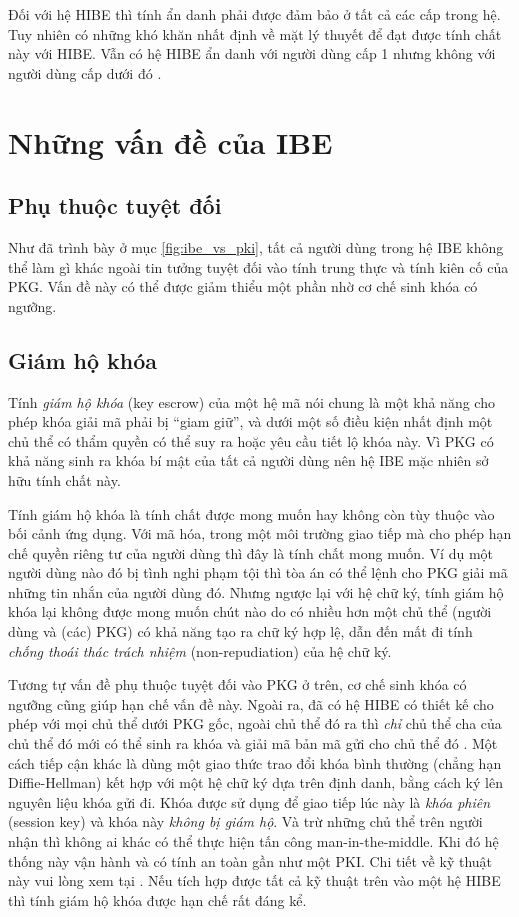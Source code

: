 \documentclass[class=report, crop=false]{standalone}
\begin{document}
			Đối với hệ HIBE thì tính ẩn danh phải được đảm bảo ở tất cả các cấp trong hệ. Tuy nhiên có những khó khăn nhất định về mặt lý thuyết để đạt được tính chất này với HIBE. Vẫn có hệ HIBE ẩn danh với người dùng cấp 1 nhưng không với người dùng cấp dưới đó \cite{DBLP:conf/asiacrypt/GentryS02}.
	\section{Những vấn đề của IBE}
		\subsection{Phụ thuộc tuyệt đối}
			Như đã trình bày ở mục \ref{fig:ibe_vs_pki}, tất cả người dùng trong hệ IBE không thể làm gì khác ngoài tin tưởng tuyệt đối vào tính trung thực và tính kiên cố của PKG. Vấn đề này có thể được giảm thiểu một phần nhờ cơ chế sinh khóa có ngưỡng.
		\subsection{Giám hộ khóa}\label{subsec:key_escrow}
			Tính \textit{giám hộ khóa} (key escrow) của một hệ mã nói chung là một khả năng cho phép khóa giải mã phải bị ``giam giữ'', và dưới một số điều kiện nhất định một chủ thể có thẩm quyền có thể suy ra hoặc yêu cầu tiết lộ khóa này. Vì PKG có khả năng sinh ra khóa bí mật của tất cả người dùng nên hệ IBE mặc nhiên sở hữu tính chất này.

			Tính giám hộ khóa là tính chất được mong muốn hay không còn tùy thuộc vào bối cảnh ứng dụng. Với mã hóa, trong một môi trường giao tiếp mà cho phép hạn chế quyền riêng tư của người dùng thì đây là tính chất mong muốn. Ví dụ một người dùng nào đó bị tình nghi phạm tội thì tòa án có thể lệnh cho PKG giải mã những tin nhắn của người dùng đó. Nhưng ngược lại với hệ chữ ký, tính giám hộ khóa lại không được mong muốn chút nào do có nhiều hơn một chủ thể (người dùng và (các) PKG) có khả năng tạo ra chữ ký hợp lệ, dẫn đến mất đi tính \textit{chống thoái thác trách nhiệm} (non-repudiation) của hệ chữ ký.

			Tương tự vấn đề phụ thuộc tuyệt đối vào PKG ở trên, cơ chế sinh khóa có ngưỡng cũng giúp hạn chế vấn đề này. Ngoài ra, đã có hệ HIBE có thiết kế cho phép với mọi chủ thể dưới PKG gốc, ngoài chủ thể đó ra thì \emph{chỉ} chủ thể cha của chủ thể đó mới có thể sinh ra khóa và giải mã bản mã gửi cho chủ thể đó \cite[mục 6.1]{DBLP:conf/asiacrypt/GentryS02}. Một cách tiếp cận khác là dùng một giao thức trao đổi khóa bình thường (chẳng hạn Diffie-Hellman) kết hợp với một hệ chữ ký dựa trên định danh, bằng cách ký lên nguyên liệu khóa gửi đi. Khóa được sử dụng để giao tiếp lúc này là \textit{khóa phiên} (session key) và khóa này \emph{không bị giám hộ}. Và trừ những chủ thể trên người nhận thì không ai khác có thể thực hiện tấn công man-in-the-middle. Khi đó hệ thống này vận hành và có tính an toàn gần như một PKI. Chi tiết về kỹ thuật này vui lòng xem tại \cite[mục 6.2]{DBLP:conf/asiacrypt/GentryS02}. Nếu tích hợp được tất cả kỹ thuật trên vào một hệ HIBE thì tính giám hộ khóa được hạn chế rất đáng kể.
\end{document}
